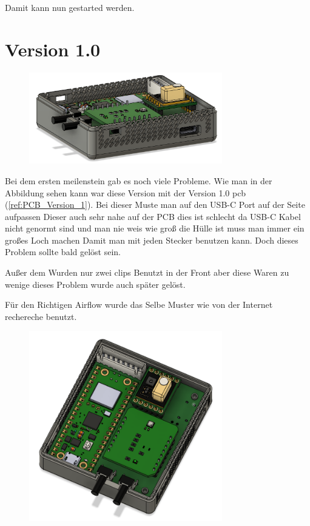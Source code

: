\begin{inhalt}
Damit kann nun gestarted werden.

\section{Version 1.0}

\begin{figure}[!htb]
\centering
\includegraphics[width=0.75\textwidth]{files/Thomas/pics/geheause/1.0/gehaeuse_side.png}
\caption[Bildbezeichnung für Abbildungsverzeichnis]{}
\label{fig:gehaeuse_internet_bild}
\end{figure}

Bei dem ersten meilenstein gab es noch viele Probleme. Wie man in der Abbildung sehen kann war diese Version mit der Version 1.0 pcb (\ref{ref:PCB_Version_1}). Bei dieser Muste man auf den USB-C Port auf der Seite aufpassen Dieser auch sehr nahe auf der PCB dies ist schlecht da USB-C Kabel nicht genormt sind und man nie weis wie groß die Hülle ist muss man immer ein großes Loch machen Damit man mit jeden Stecker benutzen kann. Doch dieses Problem sollte bald gelöst sein.

Außer dem Wurden nur zwei clips Benutzt in der Front aber diese Waren zu wenige dieses Problem wurde auch später gelöst.

Für den Richtigen Airflow wurde das Selbe Muster wie von der Internet rechereche benutzt.

\begin{figure}[!htb]
\centering
\includegraphics[width=0.75\textwidth]{files/Thomas/pics/geheause/1.0/gehaeuse_top.png}
\caption[Bildbezeichnung für Abbildungsverzeichnis]{}
\label{fig:gehaeuse_internet_bild}
\end{figure}


\end{inhalt}
